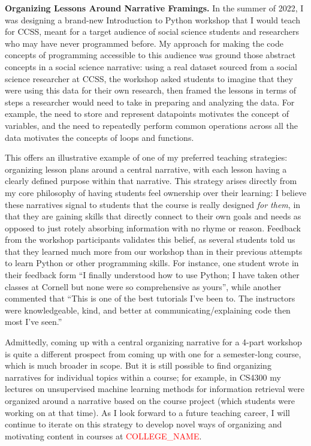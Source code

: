 \documentclass[11pt,letterpaper]{article}
\renewcommand{\section}[1]{\vspace{0.25\baselineskip}\noindent\textbf{#1.}}
\newcommand{\schoolname}{\textcolor{red}{COLLEGE\_NAME}} %
\begin{document}
\section{Organizing Lessons Around Narrative Framings}
In the summer of 2022, I was designing a brand-new Introduction to Python workshop that I would teach for CCSS, meant for a target audience of social science students and researchers who may have never programmed before.
My approach for making the code concepts of programming accessible to this audience was ground those abstract concepts in a social science narrative: using a real dataset sourced from a social science researcher at CCSS, the workshop asked students to imagine that they were using this data for their own research, then framed the lessons in terms of steps a researcher would need to take in preparing and analyzing the data.
For example, the need to store and represent datapoints motivates the concept of variables, and the need to repeatedly perform common operations across all the data motivates the concepts of loops and functions.

This offers an illustrative example of one of my preferred teaching strategies: organizing lesson plans around a central narrative, with each lesson having a clearly defined purpose within that narrative.
This strategy arises directly from my core philosophy of having students feel ownership over their learning: I believe these narratives signal to students that the course is really designed \emph{for them}, in that they are gaining skills that directly connect to their own goals and needs as opposed to just rotely absorbing information with no rhyme or reason.
Feedback from the workshop participants validates this belief, as several students told us that they learned much more from our workshop than in their previous attempts to learn Python or other programming skills.
For instance, one student wrote in their feedback form ``I finally understood how to use Python; I have taken other classes at Cornell but none were so comprehensive as yours'', while another commented that ``This is one of the best tutorials I've been to. The instructors were knowledgeable, kind, and better at communicating/explaining code then most I've seen.''

Admittedly, coming up with a central organizing narrative for a 4-part workshop is quite a different prospect from coming up with one for a semester-long course, which is much broader in scope.
But it is still possible to find organizing narratives for individual topics within a course; for example, in CS4300 my lectures on unsupervised machine learning methods for information retrieval were organized around a narrative based on the course project (which students were working on at that time).
As I look forward to a future teaching career, I will continue to iterate on this strategy to develop novel ways of organizing and motivating content in courses at \schoolname.
\end{document}
